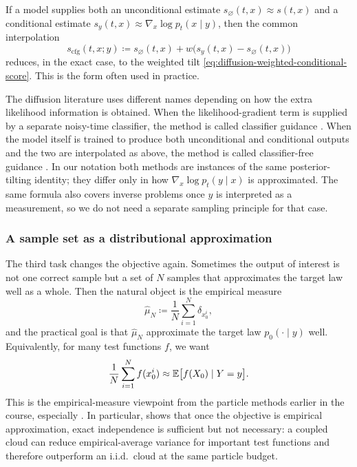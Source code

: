 If a model supplies both an unconditional estimate \(s_{\varnothing}(t,x)\approx s(t,x)\) and a conditional estimate \(s_y(t,x)\approx \nabla_x\log p_t(x\mid y)\), then the common interpolation
\[
  s_{\mathrm{cfg}}(t,x;y)
  \coloneqq
  s_{\varnothing}(t,x)+w\bigl(s_y(t,x)-s_{\varnothing}(t,x)\bigr)
\]
reduces, in the exact case, to the weighted tilt \eqref{eq:diffusion-weighted-conditional-score}.
This is the form often used in practice.

The diffusion literature uses different names depending on how the extra likelihood information is obtained.
When the likelihood-gradient term is supplied by a separate noisy-time classifier, the method is called classifier guidance \citep[\S4]{dhariwal_nichol_2021_diffusion_models_beat_gans}.
When the model itself is trained to produce both unconditional and conditional outputs and the two are interpolated as above, the method is called classifier-free guidance \citep[\S2]{ho_salimans_2022_classifier_free_guidance}.
In our notation both methods are instances of the same posterior-tilting identity; they differ only in how \(\nabla_x\log p_t(y\mid x)\) is approximated.
The same formula also covers inverse problems once \(y\) is interpreted as a measurement, so we do not need a separate sampling principle for that case.

\subsubsection{A sample set as a distributional approximation}
\label{subsubsec:diffusion-diverse-sampling}

The third task changes the objective again.
Sometimes the output of interest is not one correct sample but a set of \(N\) samples that approximates the target law well as a whole.
Then the natural object is the empirical measure
\[
  \hat\mu_N
  \coloneqq
  \frac1N\sum_{i=1}^N \delta_{x_0^i},
\]
and the practical goal is that \(\hat\mu_N\) approximate the target law \(p_0(\cdot\mid y)\) well.
Equivalently, for many test functions \(f\), we want
\[
  \frac1N\sum_{i=1}^N f(x_0^i)
  \approx
  \mathbb{E}\bigl[f(X_0)\mid Y=y\bigr].
\]
This is the empirical-measure viewpoint from the particle methods earlier in the course, especially .
In particular,  shows that once the objective is empirical approximation, exact independence is sufficient but not necessary:
a coupled cloud can reduce empirical-average variance for important test functions and therefore outperform an i.i.d.\ cloud at the same particle budget.

